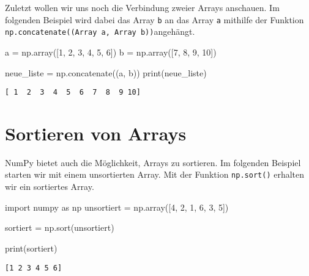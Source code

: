 \documentclass[
  letterpaper,
  DIV=11,
  numbers=noendperiod]{scrreprt}
\newenvironment{Shaded}{\begin{snugshade}}{\end{snugshade}}
\newcommand{\BuiltInTok}[1]{\textcolor[rgb]{0.00,0.23,0.31}{#1}}
\newcommand{\DecValTok}[1]{\textcolor[rgb]{0.68,0.00,0.00}{#1}}
\newcommand{\ImportTok}[1]{\textcolor[rgb]{0.00,0.46,0.62}{#1}}
\newcommand{\NormalTok}[1]{\textcolor[rgb]{0.00,0.23,0.31}{#1}}
\newcommand{\OperatorTok}[1]{\textcolor[rgb]{0.37,0.37,0.37}{#1}}
\begin{document}
\begin{tcolorbox}
Zuletzt wollen wir uns noch die Verbindung zweier Arrays anschauen. Im
folgenden Beispiel wird dabei das Array \texttt{b} an das Array
\texttt{a} mithilfe der Funktion
\texttt{np.concatenate((Array\ a,\ Array\ b))}angehängt.

\begin{Shaded}
\begin{Highlighting}[]
\NormalTok{a }\OperatorTok{=}\NormalTok{ np.array([}\DecValTok{1}\NormalTok{, }\DecValTok{2}\NormalTok{, }\DecValTok{3}\NormalTok{, }\DecValTok{4}\NormalTok{, }\DecValTok{5}\NormalTok{, }\DecValTok{6}\NormalTok{])}
\NormalTok{b }\OperatorTok{=}\NormalTok{ np.array([}\DecValTok{7}\NormalTok{, }\DecValTok{8}\NormalTok{, }\DecValTok{9}\NormalTok{, }\DecValTok{10}\NormalTok{])}

\NormalTok{neue\_liste }\OperatorTok{=}\NormalTok{ np.concatenate((a, b))}
\BuiltInTok{print}\NormalTok{(neue\_liste)}
\end{Highlighting}
\end{Shaded}

\begin{verbatim}
[ 1  2  3  4  5  6  7  8  9 10]
\end{verbatim}

\section{Sortieren von Arrays}\label{sortieren-von-arrays}

NumPy bietet auch die Möglichkeit, Arrays zu sortieren. Im folgenden
Beispiel starten wir mit einem unsortierten Array. Mit der Funktion
\texttt{np.sort()} erhalten wir ein sortiertes Array.

\begin{Shaded}
\begin{Highlighting}[]
\ImportTok{import}\NormalTok{ numpy }\ImportTok{as}\NormalTok{ np}
\NormalTok{unsortiert }\OperatorTok{=}\NormalTok{ np.array([}\DecValTok{4}\NormalTok{, }\DecValTok{2}\NormalTok{, }\DecValTok{1}\NormalTok{, }\DecValTok{6}\NormalTok{, }\DecValTok{3}\NormalTok{, }\DecValTok{5}\NormalTok{])}

\NormalTok{sortiert }\OperatorTok{=}\NormalTok{ np.sort(unsortiert)}

\BuiltInTok{print}\NormalTok{(sortiert)}
\end{Highlighting}
\end{Shaded}

\begin{verbatim}
[1 2 3 4 5 6]
\end{verbatim}


\end{tcolorbox}
\end{document}

